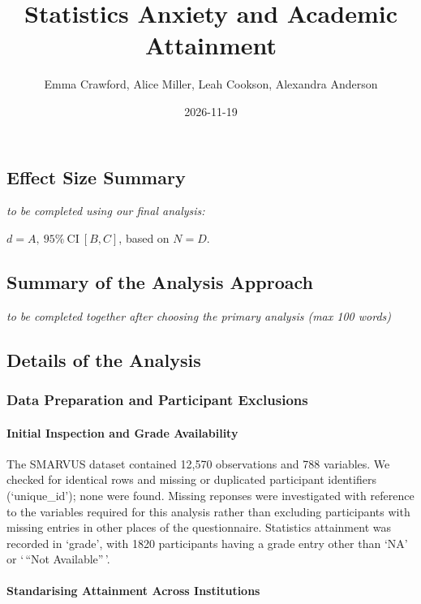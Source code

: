 \documentclass[
]{article}
\title{Statistics Anxiety and Academic Attainment}
\author{Emma Crawford, Alice Miller, Leah Cookson, Alexandra Anderson}
\date{2026-11-19}
\newcounter{none} %
\begin{document}
\maketitle

\subsection{Effect Size Summary}\label{effect-size-summary}

\emph{to be completed using our final analysis:}

\(d = A, \ 95\%\ \mathrm{CI}\ [B,C]\), based on \(N = D\).

\subsection{Summary of the Analysis
Approach}\label{summary-of-the-analysis-approach}

\emph{to be completed together after choosing the primary analysis (max
100 words)}

\subsection{Details of the Analysis}\label{details-of-the-analysis}

\subsubsection{Data Preparation and Participant
Exclusions}\label{data-preparation-and-participant-exclusions}

\paragraph{Initial Inspection and Grade
Availability}\label{initial-inspection-and-grade-availability}

The SMARVUS dataset contained 12,570 observations and 788 variables. We
checked for identical rows and missing or duplicated participant
identifiers (`unique\_id'); none were found. Missing reponses were
investigated with reference to the variables required for this analysis
rather than excluding participants with missing entries in other places
of the questionnaire. Statistics attainment was recorded in `grade',
with 1820 participants having a grade entry other than `NA' or `\,``Not
Available''\,'.

\paragraph{Standarising Attainment Across
Institutions}\label{standarising-attainment-across-institutions}
\end{document}
